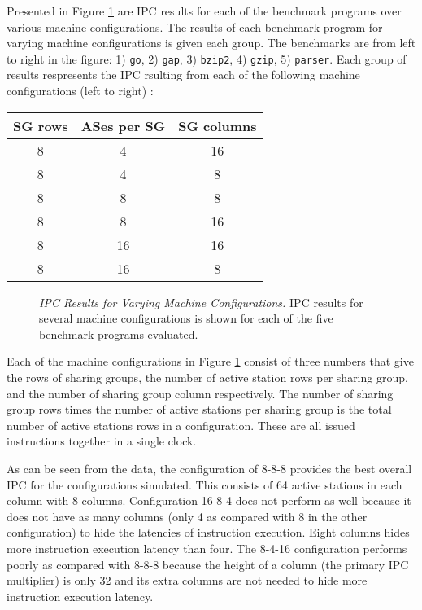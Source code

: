 \documentclass[10pt,dvips]{article}
\begin{document}
Presented in 
Figure \ref{fig:ipc} are IPC results for each of the benchmark
programs over various machine configurations.
The results of each benchmark program for varying machine
configurations is given each group.  The benchmarks are from left to
right in the figure: 1) {\tt go}, 2) {\tt gap}, 3) {\tt bzip2},
4) {\tt gzip}, 5) {\tt parser}.  Each group of results respresents
the IPC rsulting from each of the following machine configurations (left
to right) :

\begin{tabular}{|c|c|c|}
\hline 
SG rows&
ASes per SG&
SG columns\\
\hline
\hline 
8&
4&
16\\
\hline 
8&
4&
8\\
\hline 
8&
8&
8\\
\hline 
8&
8&
16\\
\hline 
8&
16&
16\\
\hline 
8&
16&
8\\
\hline
\end{tabular}

\begin{figure}
\vspace{0.2 in}
\setlength{\epsfxsize}{10cm}%
\centerline{}
\caption{{\em IPC Results for Varying Machine Configurations.} 
IPC results for several machine configurations is shown for each of
the five benchmark programs evaluated.}
\label{fig:ipc}
\end{figure}

Each of the machine configurations in Figure \ref{fig:ipc} consist of
three numbers that give the rows of sharing groups, the number of
active station rows per sharing group, and the number of sharing group
column respectively.  The number of sharing group rows times the number
of active stations per sharing group is the total number of active
stations rows in a configuration.  These are all issued instructions
together in a single clock.

As can be seen from the data, the configuration of 8-8-8 provides
the best overall IPC for the configurations simulated.  This consists
of 64 active stations in each column with 8 columns.
Configuration 16-8-4 does not perform as well because it does not
have as many columns (only 4 as compared with 8 in the other configuration)
to hide the latencies of instruction execution.  Eight columns 
hides more instruction execution latency than four.  The 8-4-16
configuration performs poorly as compared with 8-8-8 because the height
of a column (the primary IPC multiplier) is only 32 and its extra
columns are not needed to hide more instruction execution latency.
%
\end{document}
